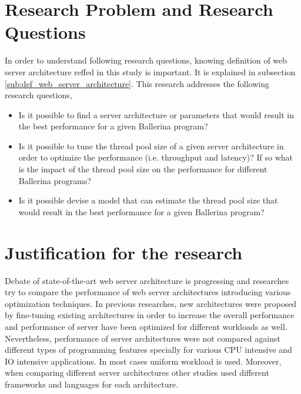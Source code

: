 \newpage

\section{Research Problem and Research Questions}\label{sec:research_questions}
 
  In order to understand following research questions, knowing definition of web server architecture reffed in this study is important. It is explained in subsection \ref{sub:def_web_server_architecture}. This research addresses the following research questions,

\begin{itemize}
	
 	
 	\item Is it possible to find a server architecture or parameters that would result in the best performance for a given Ballerina program? 
 	\item Is it possible to tune the thread pool size of a given server architecture in order to optimize the performance (i.e. throughput and latency)? If so what is the impact of the thread pool size on the performance for different Ballerina programs? 
 	\item Is it possible devise a model that can estimate the thread pool size that would result in the best performance for a given Ballerina program?
\end{itemize}




\section{Justification for the research}
 
 Debate of state-of-the-art web server architecture is progressing and researches try to compare the performance of web server architectures introducing various optimization techniques. In previous researches, new architectures were proposed by fine-tuning existing architectures in order to increase the overall performance  and performance of server have been optimized for different workloads as well. Nevertheless, performance of server architectures were not compared against different types of programming features specially for various CPU intensive and IO intensive applications. In most cases uniform workload is used. Moreover, when comparing different server architectures other studies used different frameworks and languages for each architecture.
 
